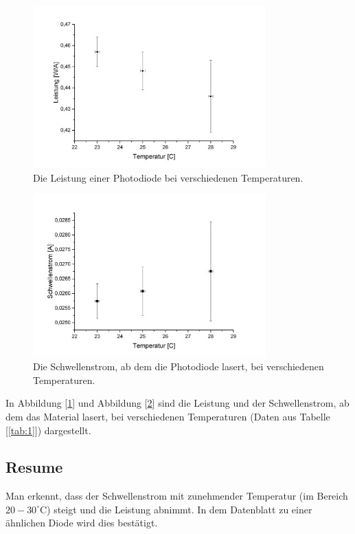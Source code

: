 \documentclass[a4paper,10pt]{scrartcl} %
\begin{document}
\begin{figure}
\centering
\caption{Die Leistung einer Photodiode bei verschiedenen Temperaturen.}
\label{fig:1_Leistung}
\includegraphics[width=0.8\textwidth]{Bilder/1_Leistung.png}
\end{figure}
\begin{figure}
\centering
\caption{Die Schwellenstrom, ab dem die Photodiode lasert, bei verschiedenen Temperaturen.}
\label{fig:1_Schwellenstrom}
\includegraphics[width=0.8\textwidth]{Bilder/1_Schwellenstrom.png}
\end{figure}
In Abbildung [\ref{fig:1_Leistung}] und Abbildung [\ref{fig:1_Schwellenstrom}] sind die Leistung und der Schwellenstrom, ab dem das Material lasert, bei verschiedenen Temperaturen (Daten aus Tabelle [\ref{tab:1}]) dargestellt.
\subsection{Resume}
\label{subsec_Lesitung_Resume}
Man erkennt, dass der Schwellenstrom mit zunehmender Temperatur (im Bereich $20 - 30 ^\circ{\text{C}}$) steigt und die Leistung abnimmt. In dem Datenblatt zu einer ähnlichen Diode \cite{Diode} wird dies bestätigt.
\end{document}
